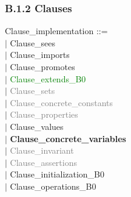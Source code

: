 \documentclass[12pt,a4paper,draft]{article}
\begin{document}
\subsubsection{B.1.2 Clauses}
\footnotesize{
\begin{sloppypar} 

Clause\_implementation ::=\\
\hspace*{0.20in} $|$ {Clause\_sees}\\
\hspace*{0.20in} $|$ {Clause\_imports}\\
\hspace*{0.20in} $|$ {Clause\_promotes}\\
\hspace*{0.20in} $|$ \textcolor{green}{Clause\_extends\_B0}\\
\hspace*{0.20in} $|$ \textcolor{gray}{Clause\_sets}\\
\hspace*{0.20in} $|$ \textcolor{gray}{Clause\_concrete\_constants}\\
\hspace*{0.20in} $|$ \textcolor{gray}{Clause\_properties}\\
\hspace*{0.20in} $|$ Clause\_values\\
\hspace*{0.20in} $|$ \textbf{Clause\_concrete\_variables}\\
\hspace*{0.20in} $|$ \textcolor{gray}{Clause\_invariant}\\
\hspace*{0.20in} $|$ \textcolor{gray}{Clause\_assertions}\\
\hspace*{0.20in} $|$ Clause\_initialization\_B0\\
\hspace*{0.20in} $|$ Clause\_operations\_B0\\
\end{sloppypar}}
\end{document}
